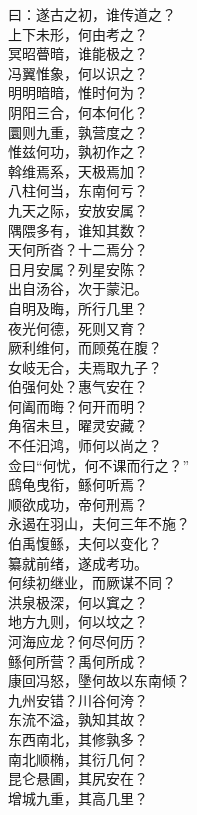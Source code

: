\documentclass[]{article}
\begin{document}
曰：遂古之初，谁传道之？\\
上下未形，何由考之？\\
冥昭瞢暗，谁能极之？\\
冯翼惟象，何以识之？\\
明明暗暗，惟时何为？\\
阴阳三合，何本何化？\\
圜则九重，孰营度之？\\
惟兹何功，孰初作之？\\
斡维焉系，天极焉加？\\
八柱何当，东南何亏？\\
九天之际，安放安属？\\
隅隈多有，谁知其数？\\
天何所沓？十二焉分？\\
日月安属？列星安陈？\\
出自汤谷，次于蒙汜。\\
自明及晦，所行几里？\\
夜光何德，死则又育？\\
厥利维何，而顾菟在腹？\\
女岐无合，夫焉取九子？\\
伯强何处？惠气安在？\\
何阖而晦？何开而明？\\
角宿未旦，曜灵安藏？\\
不任汩鸿，师何以尚之？\\
佥曰``何忧，何不课而行之？''\\
鸱龟曳衔，鲧何听焉？\\
顺欲成功，帝何刑焉？\\
永遏在羽山，夫何三年不施？\\
伯禹愎鲧，夫何以变化？\\
纂就前绪，遂成考功。\\
何续初继业，而厥谋不同？\\
洪泉极深，何以窴之？\\
地方九则，何以坟之？\\
河海应龙？何尽何历？\\
鲧何所营？禹何所成？\\
康回冯怒，墬何故以东南倾？\\
九州安错？川谷何洿？\\
东流不溢，孰知其故？\\
东西南北，其修孰多？\\
南北顺椭，其衍几何？\\
昆仑悬圃，其尻安在？\\
增城九重，其高几里？\\
\end{document}
